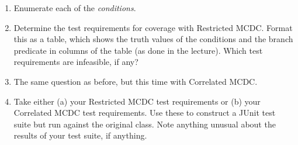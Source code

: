 \begin{enumerate}
        \begin{enumerate}

            \item Enumerate each of the {\it conditions}.
            
            \item Determine the test requirements for coverage with Restricted
            MCDC. Format this as a table, which shows the truth values of the
            conditions and the branch predicate in columns of the table (as done
            in the lecture). Which test requirements are infeasible, if any?

            \item The same question as before, but this time with Correlated MCDC. 
            
            \item Take either (a) your Restricted MCDC test requirements or (b) your
            Correlated MCDC test requirements. Use these to construct a JUnit test
            suite but run against the original \triangleclass class. Note anything
            unusual about the results of your test suite, if anything.
            
        \end{enumerate}
        
\end{enumerate}

